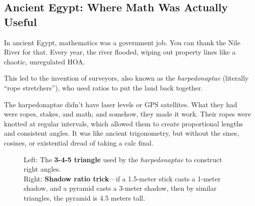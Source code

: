 \subsection{Ancient Egypt: Where Math Was Actually Useful}

In ancient Egypt, mathematics was a government job. You can thank the Nile River for that. Every year, the river flooded, wiping out property lines like a chaotic, unregulated HOA.  

This led to the invention of surveyors, also known as the \textit{harpedonaptae} (literally “rope stretchers”), who used ratios to put the land back together.  

The harpedonaptae didn’t have laser levels or GPS satellites. What they had were ropes, stakes, and math; and somehow, they made it work. Their ropes were knotted at regular intervals, which allowed them to create proportional lengths and consistent angles. It was like ancient trigonometry, but without the sines, cosines, or existential dread of taking a calc final.

\begin{figure}[H]
\centering
{}
\caption{Left: The \textbf{3-4-5 triangle} used by the \textit{harpedonaptae} to construct right angles. \\
Right: \textbf{Shadow ratio trick}—if a 1.5-meter stick casts a 1-meter shadow, and a pyramid casts a 3-meter shadow, then by similar triangles, the pyramid is 4.5 meters tall.}
\end{figure}


